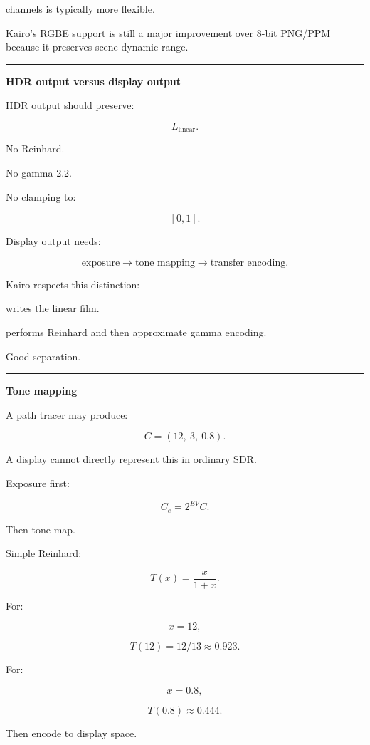 channels is typically more flexible.

Kairo's RGBE support is still a major improvement over 8-bit PNG/PPM because it preserves scene dynamic range.

\begin{center}\rule{0.5\linewidth}{0.5pt}\end{center}

\textbf{HDR output versus display output}

HDR output should preserve:

\[
L_{\text{linear}}.
\]

No Reinhard.

No gamma 2.2.

No clamping to:

\[
[0,1].
\]

Display output needs:

\[
\text{exposure}
\rightarrow
\text{tone mapping}
\rightarrow
\text{transfer encoding}.
\]

Kairo respects this distinction:

 writes the linear film.

 performs Reinhard and then approximate gamma encoding.

Good separation.

\begin{center}\rule{0.5\linewidth}{0.5pt}\end{center}

\textbf{Tone mapping}

A path tracer may produce:

\[
C=(12,\ 3,\ 0.8).
\]

A display cannot directly represent this in ordinary SDR.

Exposure first:

\[
\boxed{
C_e=
2^{EV}C.
}
\]

Then tone map.

Simple Reinhard:

\[
\boxed{
T(x)=\frac{x}{1+x}.
}
\]

For:

\[
x=12,
\]

\[
T(12)=12/13\approx0.923.
\]

For:

\[
x=0.8,
\]

\[
T(0.8)\approx0.444.
\]

Then encode to display space.

